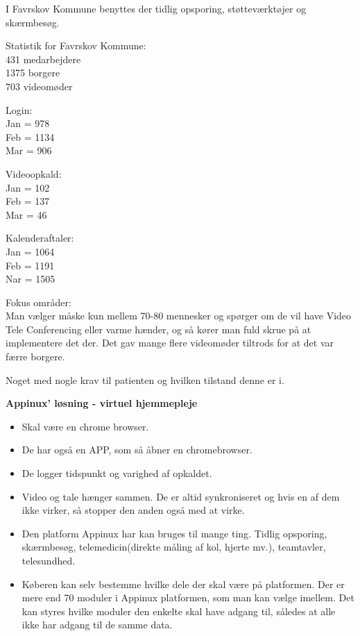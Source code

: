 I Favrskov Kommune benyttes der tidlig opsporing, støtteværktøjer og skærmbesøg.

Statistik for Favrskov Kommune: \\
431 medarbejdere \\
1375 borgere\\
703 videomøder

Login: \\
Jan = 978 \\
Feb = 1134 \\
Mar = 906

Videoopkald: \\
Jan = 102 \\
Feb = 137 \\
Mar = 46

Kalenderaftaler: \\
Jan = 1064 \\
Feb = 1191 \\
Nar = 1505

Fokus områder:\\
Man vælger måske kun mellem 70-80 mennesker og spørger om de vil have Video Tele Conferencing eller varme hænder, og så kører man fuld skrue på at implementere det der. Det gav mange flere videomøder tiltrods for at det var færre borgere.


Noget med nogle krav til patienten og hvilken tilstand denne er i. 


\textbf{Appinux' løsning - virtuel hjemmepleje} 
\begin{itemize}
	\item Skal være en chrome browser.
	\item De har også en APP, som så åbner en chromebrowser.
	\item De logger tidspunkt og varighed af opkaldet.
	\item Video og tale hænger sammen. De er altid synkroniseret og hvis en af dem ikke virker, så stopper den anden også med at virke.
	\item Den platform Appinux har kan bruges til mange ting. Tidlig opsporing, skærmbesøg, telemedicin(direkte måling af kol, hjerte mv.), teamtavler, telesundhed.
	\item Køberen kan selv bestemme hvilke dele der skal være på platformen. 
Der er mere end 70 moduler i Appinux platformen, som man kan vælge imellem.
Det kan styres hvilke moduler den enkelte skal have adgang til, således at alle ikke har adgang til de samme data.
\end{itemize}


